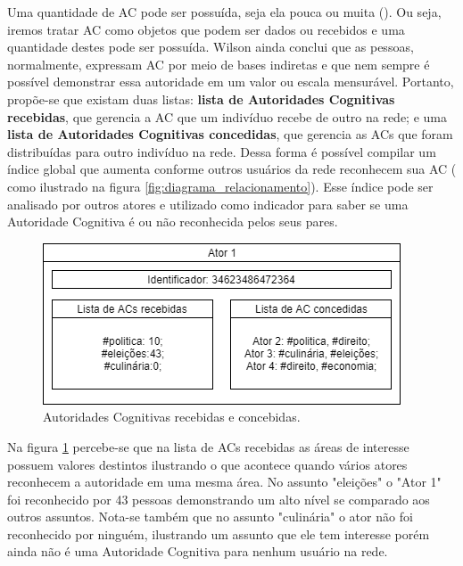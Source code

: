 Uma quantidade de AC pode ser possuída, seja ela pouca ou muita (\cite{Wilson1983}). Ou seja, iremos tratar AC como objetos que podem ser dados ou recebidos e uma quantidade destes pode ser possuída. Wilson ainda conclui que as pessoas, normalmente, expressam AC por meio de bases indiretas e que nem sempre é possível demonstrar essa autoridade em um valor ou escala mensurável. Portanto, propõe-se que existam duas listas: \textbf{lista de Autoridades Cognitivas recebidas}, que gerencia a AC que um indivíduo recebe de outro na rede; e uma \textbf{lista de Autoridades Cognitivas concedidas}, que gerencia as ACs que foram distribuídas para outro indivíduo na rede. Dessa forma é possível compilar um índice global que aumenta conforme outros usuários da rede reconhecem sua AC ( como ilustrado na figura \ref{fig:diagrama_relacionamento}). Esse índice pode ser analisado por outros atores e utilizado como indicador para saber se uma Autoridade Cognitiva é ou não reconhecida pelos seus pares. 

\begin{figure}[ht]
\centering
\includegraphics[scale=0.7]{4-proposta/diagrama_concebidos_recebidos.png}
\caption{Autoridades Cognitivas recebidas e concebidas.}
\label{fig:diagrama_recebidas_concebidas}
\end{figure}

Na figura \ref{fig:diagrama_recebidas_concebidas} percebe-se que na lista de ACs recebidas as áreas de interesse possuem valores destintos ilustrando o que acontece quando vários atores reconhecem a autoridade em uma mesma área. No assunto "eleições" o "Ator 1" foi reconhecido por 43 pessoas demonstrando um alto nível se comparado aos outros assuntos. Nota-se também que no assunto "culinária" o ator não foi reconhecido por ninguém, ilustrando um assunto que ele tem interesse porém ainda não é uma Autoridade Cognitiva para nenhum usuário na rede.




